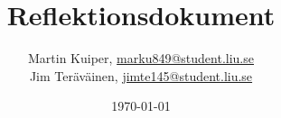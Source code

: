 \documentclass{mall}
\author{Martin Kuiper, \url{marku849@student.liu.se}\\
  Jim Teräväinen, \url{jimte145@student.liu.se}}
\title{Reflektionsdokument}
\date{\today}
\begin{document}
\projectpage
\end{document}
